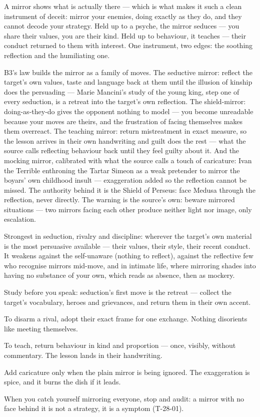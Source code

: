 \begin{core}
A mirror shows what is actually there --- which is what makes it such a clean instrument of deceit: mirror your enemies, doing exactly as they do, and they cannot decode your strategy. Held up to a psyche, the mirror seduces --- you share their values, you are their kind. Held up to behaviour, it teaches --- their conduct returned to them with interest. One instrument, two edges: the soothing reflection and the humiliating one.
\end{core}
\begin{mechanism}
B3's law builds the mirror as a family of moves. The seductive mirror: reflect the target's own values, taste and language back at them until the illusion of kinship does the persuading --- Marie Mancini's study of the young king, step one of every seduction, is a retreat into the target's own reflection. The shield-mirror: doing-as-they-do gives the opponent nothing to model --- you become unreadable because your moves are theirs, and the frustration of facing themselves makes them overreact. The teaching mirror: return mistreatment in exact measure, so the lesson arrives in their own handwriting and guilt does the rest --- what the source calls reflecting behaviour back until they feel guilty about it. And the mocking mirror, calibrated with what the source calls a touch of caricature: Ivan the Terrible enthroning the Tartar Simeon as a weak pretender to mirror the boyars' own childhood insult --- exaggeration added so the reflection cannot be missed. The authority behind it is the Shield of Perseus: face Medusa through the reflection, never directly. The warning is the source's own: beware mirrored situations --- two mirrors facing each other produce neither light nor image, only escalation.
\end{mechanism}
\begin{conditions}
Strongest in seduction, rivalry and discipline: wherever the target's own material is the most persuasive available --- their values, their style, their recent conduct. It weakens against the self-unaware (nothing to reflect), against the reflective few who recognise mirrors mid-move, and in intimate life, where mirroring shades into having no substance of your own, which reads as absence, then as mockery.
\end{conditions}
\begin{application}
  \item Study before you speak: seduction's first move is the retreat --- collect the target's vocabulary, heroes and grievances, and return them in their own accent.
  \item To disarm a rival, adopt their exact frame for one exchange. Nothing disorients like meeting themselves.
  \item To teach, return behaviour in kind and proportion --- once, visibly, without commentary. The lesson lands in their handwriting.
  \item Add caricature only when the plain mirror is being ignored. The exaggeration is spice, and it burns the dish if it leads.
  \item When you catch yourself mirroring everyone, stop and audit: a mirror with no face behind it is not a strategy, it is a symptom (T-28-01).
\end{application}
